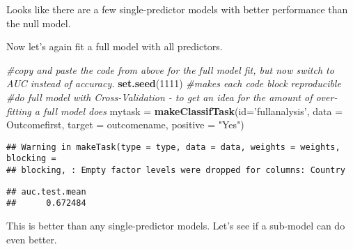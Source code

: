 \documentclass[]{article}
\newenvironment{Shaded}{\begin{snugshade}}{\end{snugshade}}
\newcommand{\CommentTok}[1]{\textcolor[rgb]{0.56,0.35,0.01}{\textit{#1}}}
\newcommand{\DataTypeTok}[1]{\textcolor[rgb]{0.13,0.29,0.53}{#1}}
\newcommand{\DecValTok}[1]{\textcolor[rgb]{0.00,0.00,0.81}{#1}}
\newcommand{\KeywordTok}[1]{\textcolor[rgb]{0.13,0.29,0.53}{\textbf{#1}}}
\newcommand{\NormalTok}[1]{#1}
\newcommand{\OperatorTok}[1]{\textcolor[rgb]{0.81,0.36,0.00}{\textbf{#1}}}
\newcommand{\OtherTok}[1]{\textcolor[rgb]{0.56,0.35,0.01}{#1}}
\newcommand{\StringTok}[1]{\textcolor[rgb]{0.31,0.60,0.02}{#1}}
\begin{document}
Looks like there are a few single-predictor models with better
performance than the null model.

Now let's again fit a full model with all predictors.

\begin{Shaded}
\begin{Highlighting}[]
\CommentTok{#copy and paste the code from above for the full model fit, but now switch to AUC instead of accuracy.}
\KeywordTok{set.seed}\NormalTok{(}\DecValTok{1111}\NormalTok{) }\CommentTok{#makes each code block reproducible}
\CommentTok{#do full model with Cross-Validation - to get an idea for the amount of over-fitting a full model does}
\NormalTok{mytask =}\StringTok{ }\KeywordTok{makeClassifTask}\NormalTok{(}\DataTypeTok{id=}\StringTok{'fullanalysis'}\NormalTok{, }\DataTypeTok{data =}\NormalTok{ Outcomefirst, }\DataTypeTok{target =}\NormalTok{ outcomename, }\DataTypeTok{positive =} \StringTok{"Yes"}\NormalTok{)}
\end{Highlighting}
\end{Shaded}

\begin{verbatim}
## Warning in makeTask(type = type, data = data, weights = weights, blocking =
## blocking, : Empty factor levels were dropped for columns: Country
\end{verbatim}

\begin{Shaded}
\end{Shaded}

\begin{verbatim}
## auc.test.mean 
##      0.672484
\end{verbatim}

This is better than any single-predictor models. Let's see if a
sub-model can do even better.
\end{document}
